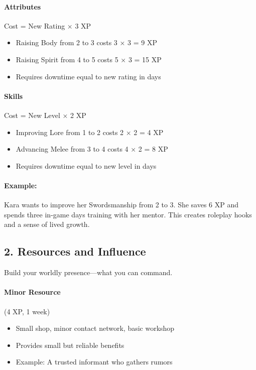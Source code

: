 \paragraph{Attributes} Cost = New Rating × 3 XP 
\begin{itemize}
\item Raising Body from 2 to 3 costs 3 × 3 = 9 XP
\item Raising Spirit from 4 to 5 costs 5 × 3 = 15 XP
\item Requires downtime equal to new rating in days
\end{itemize}

\paragraph{Skills} Cost = New Level × 2 XP 
\begin{itemize}
\item Improving Lore from 1 to 2 costs 2 × 2 = 4 XP
\item Advancing Melee from 3 to 4 costs 4 × 2 = 8 XP
\item Requires downtime equal to new level in days
\end{itemize}

\paragraph{Example:}  
Kara wants to improve her Swordsmanship from 2 to 3. She saves 6 XP and spends three in-game days training with her mentor. This creates roleplay hooks and a sense of lived growth.

\subsection*{2. Resources and Influence}

Build your worldly presence—what you can command.

\paragraph{Minor Resource} (4 XP, 1 week)
\begin{itemize}
\item Small shop, minor contact network, basic workshop
\item Provides small but reliable benefits
\item Example: A trusted informant who gathers rumors
\end{itemize}

